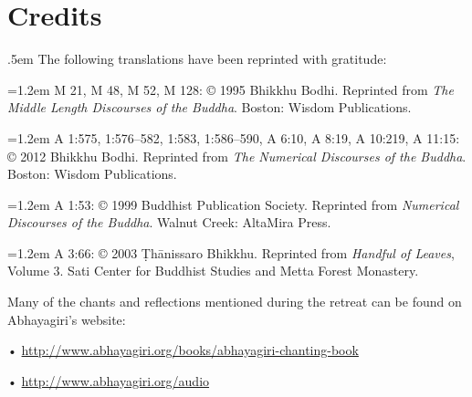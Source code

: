 \chapter{Credits}\label{credits}
{\parindent 0pt\parskip .5em
The following translations have been reprinted with gratitude:

\vspace{1em}
\hangindent=1.2em M 21, M 48, M 52, M 128: © 1995 Bhikkhu Bodhi.
Reprinted from \emph{The Middle Length Discourses of the Buddha}.
Boston: Wisdom Publications.

\hangindent=1.2em A 1:575, 1:576–582, 1:583, 1:586–590, A 6:10, A 8:19,
A 10:219, A 11:15: © 2012 Bhikkhu Bodhi. Reprinted from \emph{The
Numerical Discourses of the Buddha}. Boston: Wisdom Publications.

\hangindent=1.2em A 1:53: © 1999 Buddhist Publication Society. Reprinted
from \emph{Numerical Discourses of the Buddha}. Walnut Creek: AltaMira
Press.

\hangindent=1.2em A 3:66: © 2003 Ṭhānissaro Bhikkhu. Reprinted from
\emph{Handful of Leaves}, Volume 3. Sati Center for Buddhist Studies
and Metta Forest Monastery.


\vspace{1.5em}
Many of the chants and reflections mentioned during the retreat can be
found on Abhayagiri’s website:

•\hspace{.5em}
\href{http://www.abhayagiri.org/books/abhayagiri-chanting-book}
{http://www.abhayagiri.org/books/abhayagiri-chanting-book}

•\hspace{.5em} \href{http://www.abhayagiri.org/audio}
{http://www.abhayagiri.org/audio}

}

